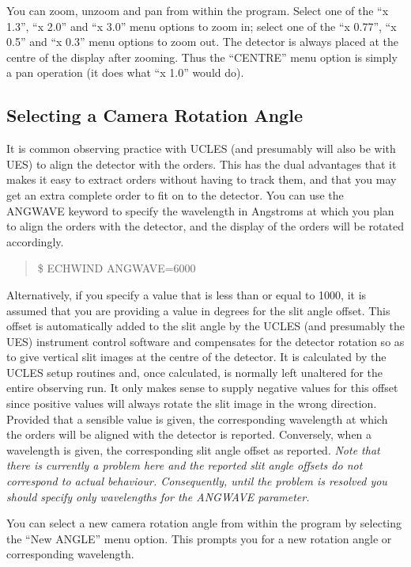You can zoom, unzoom and pan from within the program. Select one of the ``x
1.3'', ``x 2.0'' and ``x 3.0'' menu options to zoom in; select one of the ``x
0.77'', ``x 0.5'' and ``x 0.3'' menu options to zoom out. The detector is
always placed at the centre of the display after zooming. Thus the ``CENTRE''
menu option is simply a pan operation (it does what ``x 1.0'' would do).

\subsection{Selecting a Camera Rotation Angle}

It is common observing practice with UCLES (and presumably will also be with
UES) to align the detector with the orders. This has the dual advantages that
it makes it easy to extract orders without having to track them, and that you
may get an extra complete order to fit on to the detector. You can use the
ANGWAVE keyword to specify the wavelength in Angstroms at which you plan to
align the orders with the detector, and the display of the orders will be
rotated accordingly.
\begin{quote}
\$ ECHWIND ANGWAVE=6000
\end{quote}

Alternatively, if you specify a value that is less than or equal to 1000, it is
assumed that you are providing a value in degrees for the slit angle offset.
This offset is automatically added to the slit angle by the UCLES (and
presumably the UES) instrument control software and compensates for the
detector rotation so as to give vertical slit images at the centre of the
detector. It is calculated by the UCLES setup routines and, once calculated, is
normally left unaltered for the entire observing run. It only makes sense to
supply negative values for this offset since positive values will always rotate
the slit image in the wrong direction. Provided that a sensible value is given,
the corresponding wavelength at which the orders will be aligned with the
detector is reported. Conversely, when a wavelength is given, the corresponding
slit angle offset as reported. {\em Note that there is currently a problem here
and the reported slit angle offsets do not correspond to actual behaviour.
Consequently, until the problem is resolved you should specify only
wavelengths for the ANGWAVE parameter.}

You can select a new camera rotation angle from within the program by selecting
the ``New ANGLE'' menu option. This prompts you for a new rotation
angle or corresponding wavelength.

